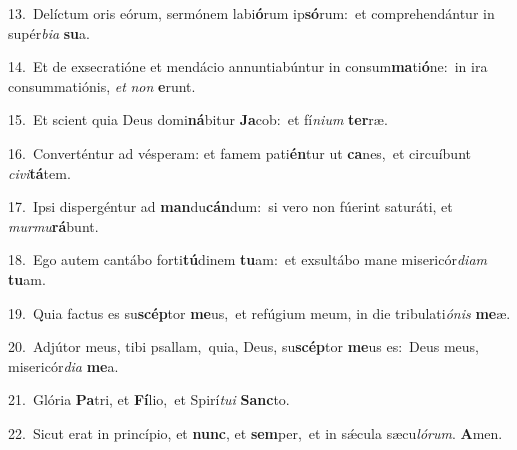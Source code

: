 {\numbfont\textcolor{\numbcolor}{13.}}~Delíctum oris eórum, sermónem labi\-\textbf{ó}\-rum ip\-\textbf{só}\-rum:~\star et comprehendántur in supér\-\textit{bi}\-\textit{a} \textbf{su}\-a.\par
{\numbfont\textcolor{\numbcolor}{14.}}~Et de exsecratióne et mendácio annuntiabúntur in consum\-\textbf{ma}\-ti\-\textbf{ó}\-ne:~\star in ira consummatiónis, \textit{et} \textit{non} \textbf{e}\-runt.\par
{\numbfont\textcolor{\numbcolor}{15.}}~Et scient quia Deus domi\-\textbf{ná}\-bitur \textbf{Ja}\-cob:~\star et fí\-\textit{ni}\-\textit{um} \textbf{ter}\-ræ.\par
{\numbfont\textcolor{\numbcolor}{16.}}~Converténtur ad vésperam: et famem pati\-\textbf{én}\-tur ut \textbf{ca}\-nes,~\star et circuíbunt \textit{ci}\-\textit{vi}\textbf{tá}tem.\par
{\numbfont\textcolor{\numbcolor}{17.}}~Ipsi dispergéntur ad \textbf{man}\-du\-\textbf{cán}\-dum:~\star si vero non fúerint saturáti, et \textit{mur}\-\textit{mu}\textbf{rá}bunt.\par
{\numbfont\textcolor{\numbcolor}{18.}}~Ego autem cantábo forti\-\textbf{tú}\-dinem \textbf{tu}\-am:~\star et exsultábo mane misericór\-\textit{di}\-\textit{am} \textbf{tu}\-am.\par
{\numbfont\textcolor{\numbcolor}{19.}}~Quia factus es su\-\textbf{scép}\-tor \textbf{me}\-us,~\star et refúgium meum, in die tribulati\-\textit{ó}\-\textit{nis} \textbf{me}\-æ.\par
{\numbfont\textcolor{\numbcolor}{20.}}~Adjútor meus, tibi psallam,~\dagger quia, Deus, su\-\textbf{scép}\-tor \textbf{me}\-us es:~\star Deus meus, misericór\-\textit{di}\-\textit{a} \textbf{me}\-a.\par
{\numbfont\textcolor{\numbcolor}{21.}}~Glória \textbf{Pa}\-tri, et \textbf{Fí}\-lio,~\star et Spirí\-\textit{tu}\-\textit{i} \textbf{Sanc}\-to.\par
{\numbfont\textcolor{\numbcolor}{22.}}~Sicut erat in princípio, et \textbf{nunc}\-, et \textbf{sem}\-per,~\star et in sǽcula sæcu\-\textit{ló}\-\textit{rum}. \textbf{A}\-men.\par
